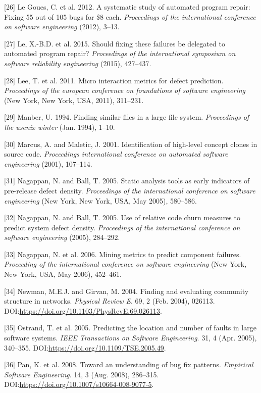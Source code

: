 \documentclass[sigconf]{acmart}
\begin{document}
[26] Le Goues, C. et al. 2012. A systematic study of automated
program repair: Fixing 55 out of 105 bugs for \$8 each.
\emph{Proceedings of the international conference on software
engineering} (2012), 3--13.


[27] Le, X.-B.D. et al. 2015. Should fixing these failures be
delegated to automated program repair? \emph{Proceedings of the
international symposium on software reliability engineering} (2015),
427--437.


[28] Lee, T. et al. 2011. Micro interaction metrics for defect
prediction. \emph{Proceedings of the european conference on foundations
of software engineering} (New York, New York, USA, 2011), 311--231.


[29] Manber, U. 1994. Finding similar files in a large file system.
\emph{Proceedings of the usenix winter} (Jan. 1994), 1--10.


[30] Marcus, A. and Maletic, J. 2001. Identification of high-level
concept clones in source code. \emph{Proceedings international
conference on automated software engineering} (2001), 107--114.


[31] Nagappan, N. and Ball, T. 2005. Static analysis tools as early
indicators of pre-release defect density. \emph{Proceedings of the
international conference on software engineering} (New York, New York,
USA, May 2005), 580--586.


[32] Nagappan, N. and Ball, T. 2005. Use of relative code churn
measures to predict system defect density. \emph{Proceedings of the
international conference on software engineering} (2005), 284--292.


[33] Nagappan, N. et al. 2006. Mining metrics to predict component
failures. \emph{Proceeding of the international conference on software
engineering} (New York, New York, USA, May 2006), 452--461.


[34] Newman, M.E.J. and Girvan, M. 2004. Finding and evaluating
community structure in networks. \emph{Physical Review E}. 69, 2 (Feb.
2004), 026113. DOI:\url{https://doi.org/10.1103/PhysRevE.69.026113}.


[35] Ostrand, T. et al. 2005. Predicting the location and number of
faults in large software systems. \emph{IEEE Transactions on Software
Engineering}. 31, 4 (Apr. 2005), 340--355.
DOI:\url{https://doi.org/10.1109/TSE.2005.49}.


[36] Pan, K. et al. 2008. Toward an understanding of bug fix
patterns. \emph{Empirical Software Engineering}. 14, 3 (Aug. 2008),
286--315. DOI:\url{https://doi.org/10.1007/s10664-008-9077-5}.
\end{document}
